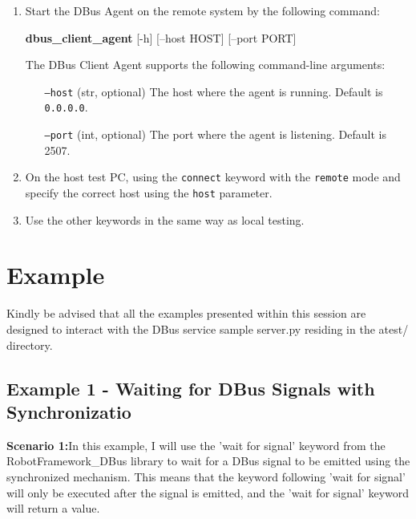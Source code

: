 \begin{enumerate}
    \item Start the DBus Agent on the remote system by the following command:

		\textbf{dbus\_client\_agent} [-h] [--host HOST] [--port PORT]

		The DBus Client Agent supports the following command-line arguments:

		\begin{itemize}
			\setlength{\itemindent}{10em}
			\item [\texttt{--host} (str, optional)] The host where the agent is running. Default is \texttt{0.0.0.0}.
			\item [\texttt{--port} (int, optional)] The port where the agent is listening. Default is 2507.
		\end{itemize}


    \item On the host test PC, using the \texttt{connect} keyword with the \texttt{remote} mode and specify the correct host using the \texttt{host} parameter.
    \item Use the other keywords in the same way as local testing.
\end{enumerate}


\hypertarget{example}{%
\section{Example}\label{example}}


Kindly be advised that all the examples presented within this session are designed to interact with the DBus service sample server.py residing in the atest/ directory.

\hypertarget{description-example1}{%
\subsection{\texorpdfstring{\textbf{Example 1 - Waiting for DBus Signals with Synchronizatio}}{Example 1 - Waiting for DBus Signals with Synchronizatio}}\label{description-example1}}

\textbf{Scenario 1:}In this example, I will use the 'wait for signal' keyword from the RobotFramework\_DBus library to wait for a DBus signal to be emitted using the synchronized mechanism.
This means that the keyword following 'wait for signal' will only be executed after the signal is emitted, and the 'wait for signal' keyword will return a value.


